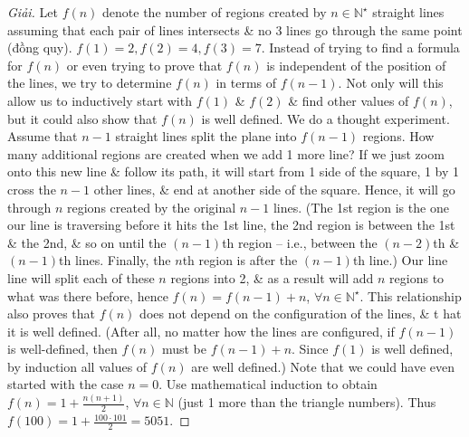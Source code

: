 \documentclass[oneside]{book}
\begin{document}
\begin{proof}[Giải]
	Let $f(n)$ denote the number of regions created by $n\in\mathbb{N}^\star$ straight lines assuming that each pair of lines intersects \& no 3 lines go through the same point (đồng quy). $f(1) = 2,f(2) = 4,f(3) = 7$. Instead of trying to find a formula for $f(n)$ or even trying to prove that $f(n)$ is independent of the position of the lines, we try to determine $f(n)$ in terms of $f(n - 1)$. Not only will this allow us to inductively start with $f(1)$ \& $f(2)$ \& find other values of $f(n)$, but it could also show that $f(n)$ is well defined. We do a thought experiment. Assume that $n - 1$ straight lines split the plane into $f(n - 1)$ regions. How many additional regions are created when we add 1 more line? If we just zoom onto this new line \& follow its path, it will start from 1 side of the square, 1 by 1 cross the $n - 1$ other lines, \& end at another side of the square. Hence, it will go through $n$ regions created by the original $n - 1$ lines. (The 1st region is the one our line is traversing before it hits the 1st line, the 2nd region is between the 1st \& the 2nd, \& so on until the $(n - 1)$th region -- i.e., between the $(n - 2)$th \& $(n - 1)$th lines. Finally, the $n$th region is after the $(n - 1)$th line.) Our line line will split each of these $n$ regions into 2, \& as a result will add $n$ regions to what was there before, hence $f(n) = f(n - 1) + n$, $\forall n\in\mathbb{N}^\star$. This relationship also proves that $f(n)$ does not depend on the configuration of the lines, \& t hat it is well defined. (After all, no matter how the lines are configured, if $f(n - 1)$ is well-defined, then $f(n)$ must be $f(n - 1) + n$. Since $f(1)$ is well defined, by induction all values of $f(n)$ are well defined.) Note that we could have even started with the case $n = 0$. Use mathematical induction to obtain $f(n) = 1 + \frac{n(n + 1)}{2}$, $\forall n\in\mathbb{N}$ (just 1 more than the triangle numbers). Thus $f(100) = 1 + \frac{100\cdot101}{2} = 5051$.
\end{proof}
\end{document}
